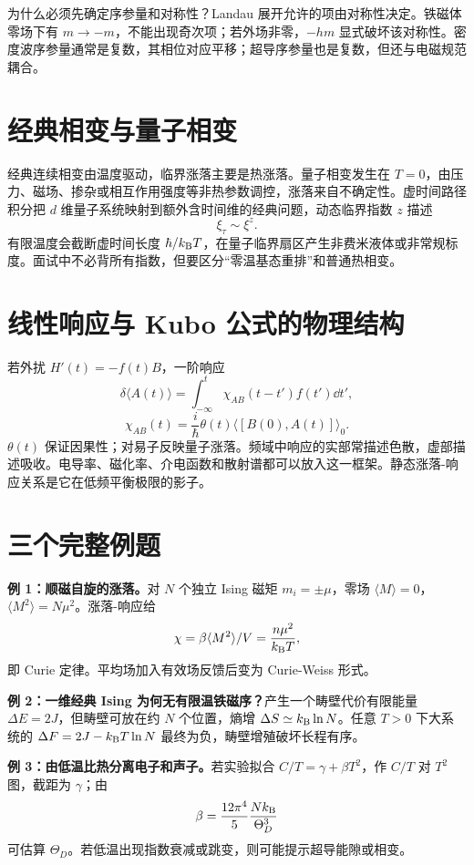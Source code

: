 \begin{whybox}
为什么必须先确定序参量和对称性？Landau 展开允许的项由对称性决定。铁磁体零场下有 $m\to-m$，不能出现奇次项；若外场非零，$-hm$ 显式破坏该对称性。密度波序参量通常是复数，其相位对应平移；超导序参量也是复数，但还与电磁规范耦合。
\end{whybox}

\section{经典相变与量子相变}
经典连续相变由温度驱动，临界涨落主要是热涨落。量子相变发生在 $T=0$，由压力、磁场、掺杂或相互作用强度等非热参数调控，涨落来自不确定性。虚时间路径积分把 $d$ 维量子系统映射到额外含时间维的经典问题，动态临界指数 $z$ 描述
\[
\xi_\tau\sim\xi^z.
\]
有限温度会截断虚时间长度 $\hbar/k_{\mathrm B} T$，在量子临界扇区产生非费米液体或非常规标度。面试中不必背所有指数，但要区分“零温基态重排”和普通热相变。

\section{线性响应与 Kubo 公式的物理结构}
若外扰
$H'(t)=-f(t)B$，一阶响应
\[
\delta\langle A(t)\rangle
=\int_{-\infty}^{t}\chi_{AB}(t-t')f(t')\dd t',
\]
\[
\boxed{\chi_{AB}(t)=\frac{i}{\hbar}\theta(t)
\langle[B(0),A(t)]\rangle_0}.
\]
$\theta(t)$ 保证因果性；对易子反映量子涨落。频域中响应的实部常描述色散，虚部描述吸收。电导率、磁化率、介电函数和散射谱都可以放入这一框架。静态涨落-响应关系是它在低频平衡极限的影子。

\section{三个完整例题}
\begin{examplebox}
\textbf{例 1：顺磁自旋的涨落。}对 $N$ 个独立 Ising 磁矩
$m_i=\pm\mu$，零场 $\langle M\rangle=0$，
$\langle M^2\rangle=N\mu^2$。涨落-响应给
\[
\chi=\beta\langle M^2\rangle/V
=\frac{n\mu^2}{k_{\mathrm B} T},
\]
即 Curie 定律。平均场加入有效场反馈后变为 Curie-Weiss 形式。
\end{examplebox}

\begin{examplebox}
\textbf{例 2：一维经典 Ising 为何无有限温铁磁序？}产生一个畴壁代价有限能量
$\Delta E=2J$，但畴壁可放在约 $N$ 个位置，熵增
$\Delta S\simeq k_{\mathrm B}\ln N$。任意 $T>0$ 下大系统的
$\Delta F=2J-k_{\mathrm B} T\ln N$ 最终为负，畴壁增殖破坏长程有序。
\end{examplebox}

\begin{examplebox}
\textbf{例 3：由低温比热分离电子和声子。}若实验拟合
$C/T=\gamma+\beta T^2$，作 $C/T$ 对 $T^2$ 图，截距为 $\gamma$；由
\[
\beta=\frac{12\pi^4}{5}\frac{Nk_{\mathrm B}}{\Theta_D^3}
\]
可估算 $\Theta_D$。若低温出现指数衰减或跳变，则可能提示超导能隙或相变。
\end{examplebox}

